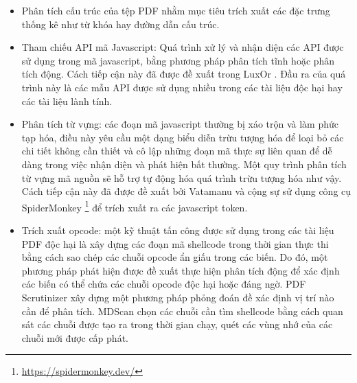 \documentclass[./../main.tex]{subfiles}
\begin{document}
\begin{itemize}
	\item Phân tích cấu trúc của tệp PDF nhằm mục tiêu trích xuất các đặc trưng thống kê như từ khóa hay đường dẫn cấu trúc.
	\item Tham chiếu API mã Javascript:  Quá trình xử lý và nhận diện các API được sử dụng trong mã javascript, bằng phương pháp phân tích tĩnh hoặc phân tích động. Cách tiếp cận này đã được đề xuất trong LuxOr \cite{luxor}. Đầu ra của quá trình này là các mẫu API được sử dụng nhiều trong các tài liệu độc hại hay các tài liệu lành tính.
	\item Phân tích từ vựng: các đoạn mã javascript thường bị xáo trộn và làm phức tạp hóa, điều này yêu cầu một dạng biểu diễn trừu tượng hóa để loại bỏ các chi tiết không cần thiết và cô lập những đoạn mã thực sự liên quan để dễ dàng trong việc nhận diện và phát hiện bất thường. Một quy trình phân tích từ vựng mã nguồn sẽ hỗ trợ tự động hóa quá trình trừu tượng hóa như vậy. Cách tiếp cận này đã được đề xuất bởi Vatamanu và cộng sự \cite{vatamanu} sử dụng công cụ SpiderMonkey \footnote{\url{https://spidermonkey.dev/}} để trích xuất ra các javascript token.
	\item Trích xuất opcode: một kỹ thuật tấn công được sử dụng trong các tài liệu PDF độc hại là xây dựng các đoạn mã shellcode trong thời gian thực thi bằng cách sao chép các chuỗi opcode ẩn giấu trong các biến. Do đó, một phương pháp phát hiện được đề xuất thực hiện phân tích động để xác định các biến có thể chứa các chuỗi opcode độc hại hoặc đáng ngờ. PDF Scrutinizer \cite{scrutinizer} xây dựng một phương pháp phỏng đoán đề xác định vị trí nào cần để phân tích. MDScan \cite{mdscan} chọn các chuỗi cần tìm shellcode bằng cách quan sát các chuỗi được tạo ra trong thời gian chạy, quét các vùng nhớ của các chuỗi mới được cấp phát.

\end{itemize}
\end{document}
